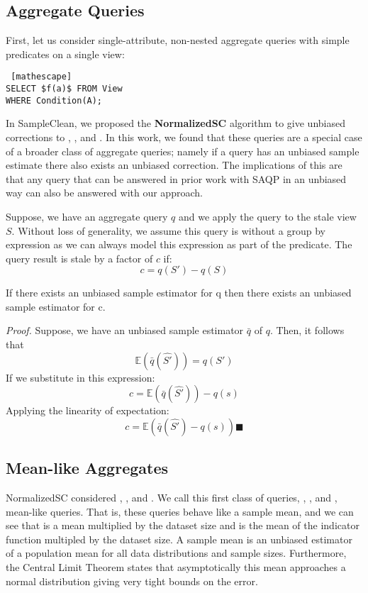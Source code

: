 \subsection{ Aggregate Queries}
First, let us consider single-attribute, non-nested aggregate queries with simple predicates on a single view:
\begin{lstlisting} [mathescape]
SELECT $f(a)$ FROM View 
WHERE Condition(A);
\end{lstlisting}

In SampleClean, we proposed the \textbf{NormalizedSC} algorithm to give unbiased corrections to \sumfunc, \countfunc, and \avgfunc.
In this work, we found that these queries are a special case of a broader class of aggregate queries; namely if a query has an unbiased sample estimate there also exists an unbiased correction.
The implications of this are that any query that can be answered in prior work with SAQP in an unbiased way can also be answered with our approach.

Suppose, we have an aggregate query $q$ and we apply the query to the stale view $S$.
Without loss of generality, we assume this query is without a group by expression as we can always model this expression as part of the predicate.
The query result is stale by a factor of $c$ if:
\[ c = q(S') - q(S)\] 
\begin{lemma}
If there exists an unbiased sample estimator for q then there exists an unbiased sample estimator for c.
\end{lemma}

\emph{Proof.} Suppose, we have an unbiased sample estimator $\bar{q}$ of $q$. 
Then, it follows that \[\mathbb{E}(\bar{q}(\hat{S'})) = q(S')\]
If we substitute in this expression:
\[ c = \mathbb{E}(\bar{q}(\hat{S'})) -q(s) \] 
Applying the linearity of expectation:
\[ c = \mathbb{E}(\bar{q}(\hat{S'}) - q(s)) \blacksquare \]

\subsection{Mean-like Aggregates}
NormalizedSC considered \sumfunc, \countfunc, and \avgfunc.
We call this first class of queries,  \sumfunc, \countfunc, and \avgfunc, mean-like queries.
That is, these queries behave like a sample mean, and we can see that \sumfunc is a mean multiplied by the dataset size and \countfunc is the mean of the indicator function multipled by the dataset size.
A sample mean is an unbiased estimator of a population mean for all data distributions and sample sizes.
Furthermore, the Central Limit Theorem states that asymptotically this mean approaches a normal distribution giving very tight bounds on the error.

